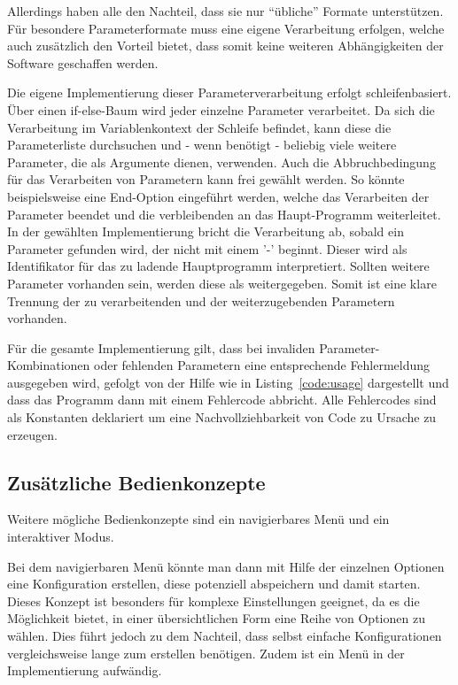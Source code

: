 Allerdings haben alle den Nachteil, dass sie nur "`übliche"' Formate unterstützen. Für besondere Parameterformate muss eine eigene Verarbeitung erfolgen, welche auch zusätzlich den Vorteil bietet, dass somit keine weiteren Abhängigkeiten der Software geschaffen werden.

Die eigene Implementierung dieser Parameterverarbeitung erfolgt schleifenbasiert. Über einen if-else-Baum wird jeder einzelne Parameter verarbeitet. Da sich die Verarbeitung im Variablenkontext der Schleife befindet, kann diese die Parameterliste durchsuchen und - wenn benötigt - beliebig viele weitere Parameter, die als Argumente dienen, verwenden. Auch die Abbruchbedingung für das Verarbeiten von Parametern kann frei gewählt werden. So könnte beispielsweise eine End-Option eingeführt werden, welche das Verarbeiten der Parameter beendet und die verbleibenden an das Haupt-Programm weiterleitet. In der gewählten Implementierung bricht die Verarbeitung ab, sobald ein Parameter gefunden wird, der nicht mit einem '-' beginnt. Dieser wird als Identifikator für das zu ladende Hauptprogramm interpretiert. Sollten weitere Parameter vorhanden sein, werden diese als  weitergegeben. Somit ist eine klare Trennung der zu verarbeitenden und der weiterzugebenden Parametern vorhanden.

Für die gesamte Implementierung gilt, dass bei invaliden Parameter-Kombinationen oder fehlenden Parametern eine entsprechende Fehlermeldung ausgegeben wird, gefolgt von der Hilfe wie in Listing~\ref{code:usage} dargestellt und dass das Programm dann mit einem Fehlercode abbricht. Alle Fehlercodes sind als Konstanten deklariert um eine Nachvollziehbarkeit von Code zu Ursache zu erzeugen.

 

\subsection{Zusätzliche Bedienkonzepte}

Weitere mögliche Bedienkonzepte sind ein navigierbares Menü und ein interaktiver Modus.

Bei dem navigierbaren Menü könnte man dann mit Hilfe der einzelnen Optionen eine Konfiguration erstellen, diese potenziell abspeichern und damit starten. Dieses Konzept ist besonders für komplexe Einstellungen geeignet, da es die Möglichkeit bietet, in einer übersichtlichen Form eine Reihe von Optionen zu wählen. Dies führt jedoch zu dem Nachteil, dass selbst einfache Konfigurationen vergleichsweise lange zum erstellen benötigen. Zudem ist ein Menü in der Implementierung aufwändig.

